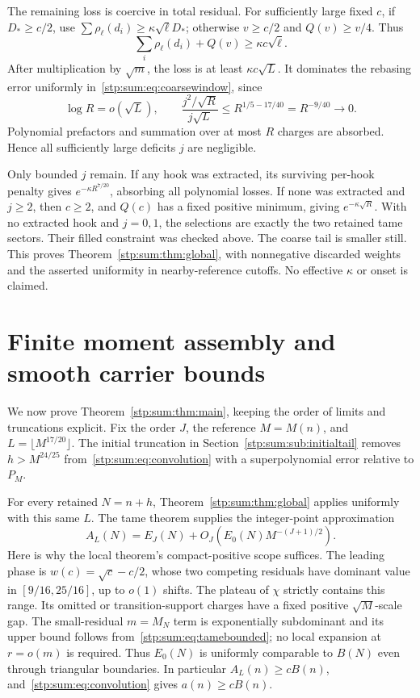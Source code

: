 \documentclass[11pt]{article}
\theoremstyle{remark}\newtheorem{remark}[theorem]{Remark}
\begin{document}
The remaining loss is coercive in total residual. For sufficiently large fixed $c$, if $D_*\ge c/2$, use $\sum\rho_\ell(d_i)\ge\kappa\sqrt\ell D_*$; otherwise $v\ge c/2$ and $Q(v)\ge v/4$. Thus
\[
 \sum_i\rho_\ell(d_i)+Q(v)\ge\kappa c\sqrt\ell.
\]
After multiplication by $\sqrt m$, the loss is at least $\kappa c\sqrt L$. It dominates the rebasing error uniformly in~\eqref{stp:sum:eq:coarsewindow}, since
\[
 \log R=o(\sqrt L),\qquad
 \frac{j^2/\sqrt R}{j\sqrt L}
 \le R^{1/5-17/40}=R^{-9/40}\longrightarrow0.
\]
Polynomial prefactors and summation over at most $R$ charges are absorbed. Hence all sufficiently large deficits $j$ are negligible.

Only bounded $j$ remain. If any hook was extracted, its surviving per-hook penalty gives $e^{-\kappa R^{7/20}}$, absorbing all polynomial losses. If none was extracted and $j\ge2$, then $c\ge2$, and $Q(c)$ has a fixed positive minimum, giving $e^{-\kappa\sqrt R}$. With no extracted hook and $j=0,1$, the selections are exactly the two retained tame sectors. Their filled constraint was checked above. The coarse tail is smaller still. This proves Theorem~\ref{stp:sum:thm:global}, with nonnegative discarded weights and the asserted uniformity in nearby-reference cutoffs. No effective $\kappa$ or onset is claimed.

\section{Finite moment assembly and smooth carrier bounds}
\label{stp:sum:sec:assembly}
We now prove Theorem~\ref{stp:sum:thm:main}, keeping the order of limits and truncations explicit. Fix the order $J$, the reference $M=M(n)$, and $L=\lfloor M^{17/20}\rfloor$. The initial truncation in Section~\ref{stp:sum:sub:initialtail} removes $h>M^{24/25}$ from~\eqref{stp:sum:eq:convolution} with a superpolynomial error relative to $P_M$.

For every retained $N=n+h$, Theorem~\ref{stp:sum:thm:global} applies uniformly with this same $L$. The tame theorem supplies the integer-point approximation
\begin{equation}\label{stp:sum:eq:filledlocal}
 A_L(N)=E_J(N)+O_J(E_0(N)M^{-(J+1)/2}).
\end{equation}
Here is why the local theorem's compact-positive scope suffices. The leading phase is $w(c)=\sqrt c-c/2$, whose two competing residuals have dominant value in $[9/16,25/16]$, up to $o(1)$ shifts. The plateau of $\chi$ strictly contains this range. Its omitted or transition-support charges have a fixed positive $\sqrt M$-scale gap. The small-residual $m=M_N$ term is exponentially subdominant and its upper bound follows from~\eqref{stp:sum:eq:tamebounded}; no local expansion at $r=o(m)$ is required. Thus $E_0(N)$ is uniformly comparable to $B(N)$ even through triangular boundaries. In particular $A_L(n)\ge cB(n)$, and~\eqref{stp:sum:eq:convolution} gives $a(n)\ge cB(n)$.
\end{document}
